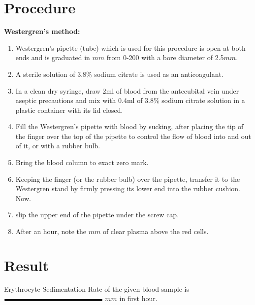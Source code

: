 \documentclass[a4paper,12pt]{book}
\begin{document}
												\section*{Procedure}
												\textbf{Westergren’s method:}\newline
												\begin{enumerate}	
													\item{Westergren’s pipette (tube) which is used for this procedure is open at both ends and is graduated in $mm$ from 0-200 with a bore diameter of 2.5$mm$.}
													\item{A sterile solution of 3.8\% sodium citrate is used as an anticoagulant.}
													\item{In a clean dry syringe, draw 2ml of blood from the antecubital vein under aseptic precautions and mix with 0.4ml of 3.8\% sodium citrate solution in a plastic  container with its lid closed.}
													\item{Fill the Westergren’s pipette with blood by sucking, after placing the tip of the finger over the top of the pipette to control the flow of blood into and out of it, or with a rubber bulb.}
													\item{Bring the blood column to exact zero mark.}
													\item{Keeping the finger (or the rubber bulb) over the pipette, transfer it to the Westergren stand by firmly pressing its lower end into the rubber cushion. Now.}
													\item{slip the upper end of the pipette under the screw cap.}
													\item{After an hour, note the $mm$ of clear plasma above the red cells.}
												\end{enumerate}
												\section*{Result}
												Erythrocyte Sedimentation Rate of the given blood sample is $\rule{5cm}{0.1cm}$ $mm$ in first hour.
\end{document}
